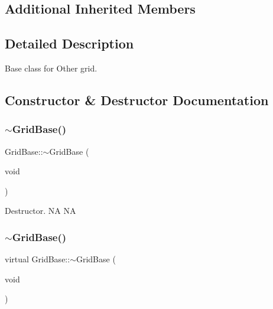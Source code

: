 \subsection*{Additional Inherited Members}


\subsection{Detailed Description}
Base class for Other grid. 

\subsection{Constructor \& Destructor Documentation}
\mbox{\label{classGridBase_a26efa190f5b2fb3d4c1a789700f5f9b1}} 
\subsubsection{\texorpdfstring{$\sim$\+Grid\+Base()}{~GridBase()}\hspace{0.1cm}{\footnotesize\ttfamily [1/2]}}
{\footnotesize\ttfamily Grid\+Base\+::$\sim$\+Grid\+Base (\begin{DoxyParamCaption}\item[{void}]{ }\end{DoxyParamCaption})\hspace{0.3cm}{\ttfamily [virtual]}}

Destructor.  NA  NA \mbox{\label{classGridBase_a570e43e284b8cdfc261414d6ebb07aa0}} 
\subsubsection{\texorpdfstring{$\sim$\+Grid\+Base()}{~GridBase()}\hspace{0.1cm}{\footnotesize\ttfamily [2/2]}}
{\footnotesize\ttfamily virtual Grid\+Base\+::$\sim$\+Grid\+Base (\begin{DoxyParamCaption}\item[{void}]{ }\end{DoxyParamCaption})\hspace{0.3cm}{\ttfamily [virtual]}}

